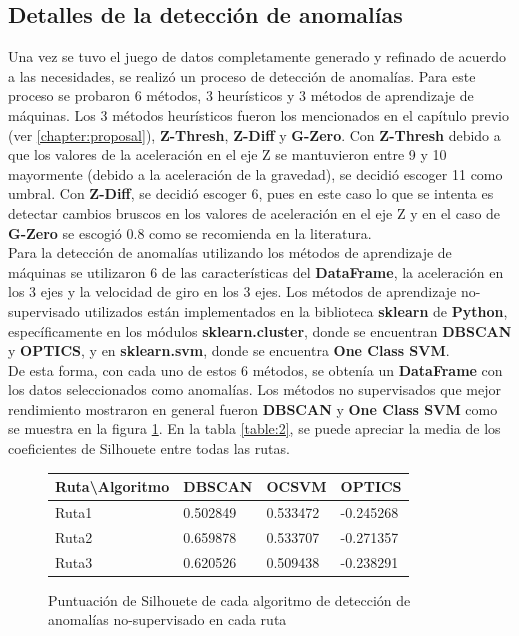 	\subsection{Detalles de la detección de anomalías}
		Una vez se tuvo el juego de datos completamente generado y refinado de acuerdo a las necesidades, se realizó un proceso de detección de anomalías.
		Para este proceso se probaron 6 métodos, 3 heurísticos y 3 métodos de aprendizaje de máquinas. Los 3 métodos heurísticos fueron los mencionados 
		en el capítulo previo (ver \ref{chapter:proposal}), \textbf{Z-Thresh}, \textbf{Z-Diff} y \textbf{G-Zero}. Con \textbf{Z-Thresh} debido a que 
		los valores de la aceleración en el eje Z se mantuvieron entre 9 y 10 mayormente (debido a la aceleración de la gravedad), se decidió escoger
		11 como umbral. Con \textbf{Z-Diff}, se decidió escoger 6, pues en este caso lo que se intenta es detectar cambios bruscos en los valores de
		aceleración en el eje Z y en el caso de \textbf{G-Zero} se escogió 0.8 como se recomienda en la literatura.\\
		\indent Para la detección de anomalías utilizando los métodos de aprendizaje de máquinas se utilizaron 6 de las características del \textbf
		{DataFrame}, la aceleración en los 3 ejes y la velocidad de giro en los 3 ejes. Los métodos de aprendizaje no-supervisado utilizados están
		implementados en la biblioteca \textbf{sklearn} de \textbf{Python}, específicamente en los módulos \textbf{sklearn.cluster}, donde se encuentran
		\textbf{DBSCAN} y \textbf{OPTICS}, y en \textbf{sklearn.svm}, donde se encuentra \textbf{One Class SVM}.\\
		\indent De esta forma, con cada uno de estos 6 métodos, se obtenía un \textbf{DataFrame} con los datos seleccionados como anomalías.
		Los métodos no supervisados que mejor rendimiento mostraron en general fueron \textbf{DBSCAN} y \textbf{One Class SVM} como se muestra en 
		la figura \ref{table:1}. En la tabla \ref{table:2}, se puede apreciar la media de los coeficientes de Silhouete entre todas las rutas.

		\begin{figure}[htb]
			\centering
			\begin{tabular}{llll}
			\toprule
			  Ruta\textbackslash Algoritmo &    DBSCAN &     OCSVM &     OPTICS \\
			\midrule
			  Ruta1 &  0.502849 &  0.533472 &  -0.245268 \\
			  Ruta2 &  0.659878 &  0.533707 &  -0.271357 \\
			  Ruta3 &  0.620526 &  0.509438 &  -0.238291 \\
			\bottomrule
			\end{tabular}
			\caption{Puntuación de Silhouete de cada algoritmo de detección de anomalías no-supervisado en cada ruta}
			\label{table:1}
		\end{figure}

